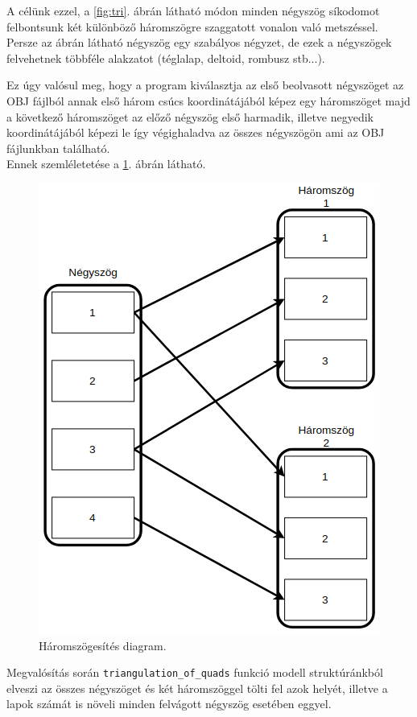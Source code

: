 \noindent A célünk ezzel, a \ref{fig:tri}. ábrán  látható módon minden négyszög síkodomot felbontsunk két különböző háromszögre szaggatott vonalon való metszéssel. Persze az ábrán látható négyszög egy szabályos négyzet, de ezek a négyszögek felvehetnek többféle alakzatot (téglalap, deltoid, rombusz stb...).

Ez úgy valósul meg, hogy a program kiválasztja az első beolvasott négyszöget az OBJ fájlból annak első három csúcs koordinátájából képez egy háromszöget majd a következő háromszöget az előző négyszög első harmadik, illetve negyedik koordinátájából képezi le így végighaladva az összes négyszögön ami az OBJ fájlunkban található.\\Ennek szemléletetése a \ref{fig:tri1}. ábrán látható.
\begin{figure}[h]
\centering
\includegraphics[scale=0.39]{images/haromszog.png}
\caption{Háromszögesítés diagram.}
\label{fig:tri1}
\end{figure}
\newpage

Megvalósítás során \texttt{triangulation\_of\_quads} funkció modell struktúránkból elveszi az összes négyszöget és két háromszöggel tölti fel azok helyét, illetve a lapok számát is növeli minden felvágott négyszög esetében eggyel.

